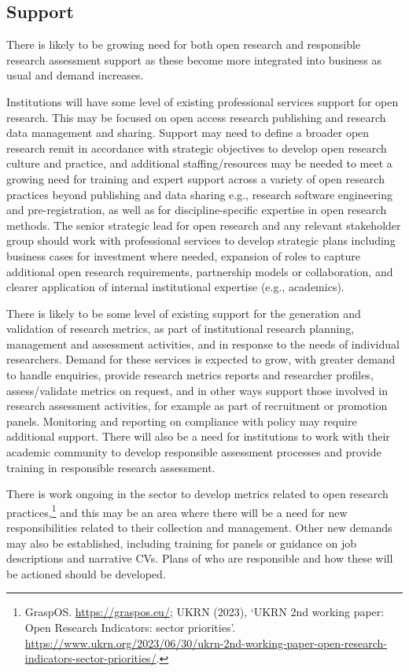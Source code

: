 \documentclass[
  letterpaper,
  DIV=11,
  numbers=noendperiod,
  oneside]{scrreprt}
\begin{document}
\subsection{Support}\label{support}

There is likely to be growing need for both open research and
responsible research assessment support as these become more integrated
into business as usual and demand increases.

Institutions will have some level of existing professional services
support for open research. This may be focused on open access research
publishing and research data management and sharing. Support may need to
define a broader open research remit in accordance with strategic
objectives to develop open research culture and practice, and additional
staffing/resources may be needed to meet a growing need for training and
expert support across a variety of open research practices beyond
publishing and data sharing e.g., research software engineering and
pre-registration, as well as for discipline-specific expertise in open
research methods. The senior strategic lead for open research and any
relevant stakeholder group should work with professional services to
develop strategic plans including business cases for investment where
needed, expansion of roles to capture additional open research
requirements, partnership models or collaboration, and clearer
application of internal institutional expertise (e.g., academics).

There is likely to be some level of existing support for the generation
and validation of research metrics, as part of institutional research
planning, management and assessment activities, and in response to the
needs of individual researchers. Demand for these services is expected
to grow, with greater demand to handle enquiries, provide research
metrics reports and researcher profiles, assess/validate metrics on
request, and in other ways support those involved in research assessment
activities, for example as part of recruitment or promotion panels.
Monitoring and reporting on compliance with policy may require
additional support. There will also be a need for institutions to work
with their academic community to develop responsible assessment
processes and provide training in responsible research assessment.

There is work ongoing in the sector to develop metrics related to open
research practices,\footnote{GraspOS. \url{https://graspos.eu/}; UKRN
  (2023), `UKRN 2nd working paper: Open Research Indicators: sector
  priorities'.
  \url{https://www.ukrn.org/2023/06/30/ukrn-2nd-working-paper-open-research-indicators-sector-priorities/}.}
and this may be an area where there will be a need for new
responsibilities related to their collection and management. Other new
demands may also be established, including training for panels or
guidance on job descriptions and narrative CVs. Plans of who are
responsible and how these will be actioned should be developed.
\end{document}
